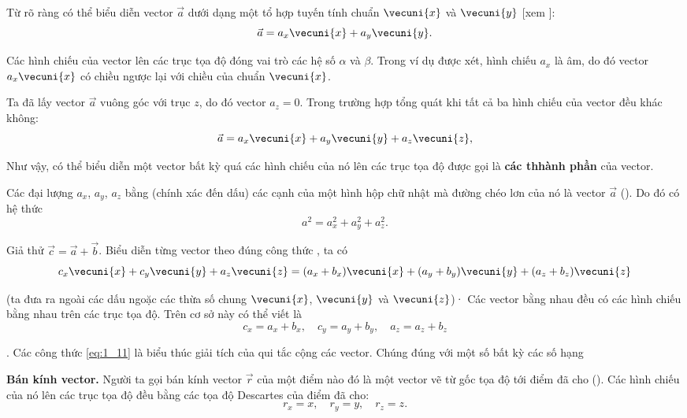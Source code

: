 Từ  rõ ràng có thể biểu diễn vector $\vec{a}$ dưới dạng một tổ hợp tuyến tính chuẩn $\vecuni{x}$ và $\vecuni{y}$ [xem ]:
\begin{equation*}
\vec{a} = a_x \vecuni{x} + a_y \vecuni{y}.
\end{equation*}

\noindent
Các hình chiếu của vector lên các trục tọa độ đóng vai trò các hệ số $\alpha$ và $\beta$. Trong ví dụ được xét, hình chiếu $a_x$ là âm, do đó vector $a_x\vecuni{x}$ có chiều ngược lại với chiều của chuẩn $\vecuni{x}$.

Ta đã lấy vector $\vec{a}$ vuông góc với trục $z$, do đó vector $a_z=0$. Trong trường hợp tổng quát khi tất cả ba hình chiếu của vector đều khác không:
\begin{equation}\label{eq:1_9}
\vec{a} = a_x \vecuni{x} + a_y \vecuni{y} + a_z \vecuni{z},
\end{equation}

\noindent
Như vậy, có thể biểu diễn một vector bất kỳ quá các hình chiếu của nó lên các trục tọa độ được gọi là \textbf{các thhành phần} của vector.

Các đại lượng $a_x$, $a_y$, $a_z$ bằng (chính xác đến dấu) các cạnh của một hình hộp chữ nhật mà đường chéo lơn của nó là vector $\vec{a}$ (). Do đó có hệ thức
\begin{equation}\label{eq:1_10}
a^2 = a_x^2 + a_y^2 + a_z^2.
\end{equation}

Giả thử $\vec{c}=\vec{a}+\vec{b}$. Biểu diễn từng vector theo đúng công thức , ta có
\begin{equation*}
c_x\vecuni{x} + c_y\vecuni{y} + a_z\vecuni{z} = (a_x+b_x)\vecuni{x} + (a_y+b_y)\vecuni{y} + (a_z+b_z)\vecuni{z}
\end{equation*}

\noindent
(ta đưa ra ngoài các dấu ngoặc các thừa số chung $\vecuni{x}$, $\vecuni{y}$ và $\vecuni{z}$)· Các vector bằng nhau đều có các hình chiếu bằng nhau trên các trục tọa độ. Trên cơ sở này có thể viết là
\begin{equation}\label{eq:1_11}
c_x=a_x+b_x,\quad c_y=a_y+b_y,\quad a_z=a_z+b_z
\end{equation}

. Các công thức \eqref{eq:1_11} là biểu thúc giải tích của qui tắc cộng các vector. Chúng đúng với một số bất kỳ các số hạng

\textbf{Bán kính vector.} Người ta gọi bán kính vector $\vec{r}$ của một điểm nào đó là một vector vẽ từ gốc tọa độ tới điểm đã cho (). Các hình chiếu của nó lên các trục tọa độ đều bằng các tọa độ Descartes của điểm đã cho:
\begin{equation}\label{eq:1_12}
r_x=x,\quad r_y=y,\quad r_z=z.
\end{equation}

